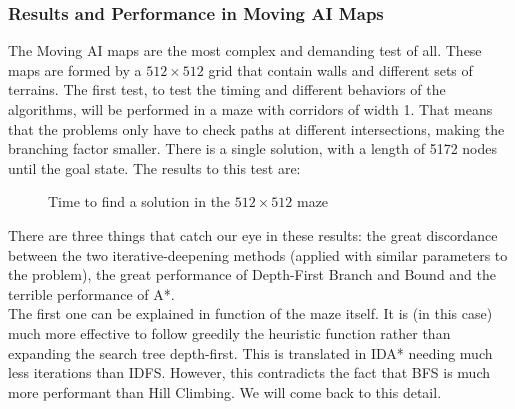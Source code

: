 \subsubsection{Results and Performance in Moving AI Maps}

The Moving AI maps are the most complex and demanding test of all. These maps
are formed by a $512 \times 512$ grid that contain walls and different sets of
terrains. The first test, to test the timing and different behaviors of the
algorithms, will be performed in a maze with corridors of width 1. That means
that the problems only have to check paths at different intersections, making
the branching factor smaller. There is a single solution, with a length of 5172
nodes until the goal state. The results to this test are:\\

\begin{figure}[!htbp]
  \centering
  \caption{Time to find a solution in the $512 \times 512$ maze}
  \label{mp:time}
\end{figure}

There are three things that catch our eye in these results: the great
discordance between the two iterative-deepening methods (applied with similar
parameters to the problem), the great performance of Depth-First Branch and
Bound and the terrible performance of A*.\\

The first one can be explained in function of the maze itself. It is (in this
case) much more effective to follow greedily the heuristic function rather than
expanding the search tree depth-first. This is translated in IDA* needing much
less iterations than IDFS. However, this contradicts the fact that BFS is much
more performant than Hill Climbing. We will come back to this detail.\\

